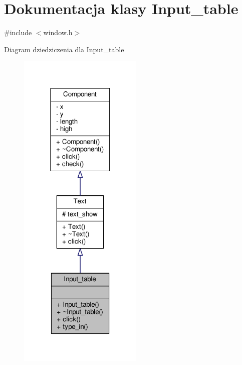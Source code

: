 \hypertarget{classInput__table}{}\section{Dokumentacja klasy Input\+\_\+table}
\label{classInput__table}


{\ttfamily \#include $<$window.\+h$>$}



Diagram dziedziczenia dla Input\+\_\+table
\nopagebreak
\begin{figure}[H]
\begin{center}
\leavevmode
\includegraphics[width=168pt]{classInput__table__inherit__graph}
\end{center}
\end{figure}


